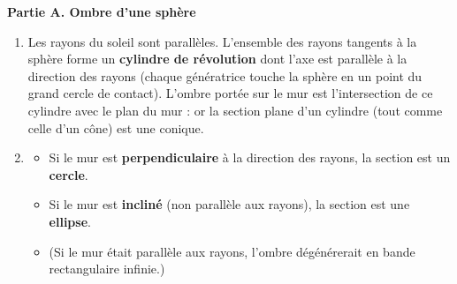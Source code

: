 \documentclass[11pt]{article}
\newcommand{\cle}[1]{{\popxbold\color{popdark}#1}}
\begin{document}
\begin{corrige}
\textbf{Partie A. Ombre d'une sphère}
\begin{enumerate}
\item Les rayons du soleil sont parallèles. L'ensemble des rayons tangents à la sphère forme un \textbf{cylindre de révolution} dont l'axe est parallèle à la direction des rayons (chaque génératrice touche la sphère en un point du grand cercle de contact). L'ombre portée sur le mur est l'intersection de ce cylindre avec le plan du mur : or la section plane d'un cylindre (tout comme celle d'un cône) est une \cle{conique}.
\item \begin{itemize}
    \item Si le mur est \textbf{perpendiculaire} à la direction des rayons, la section est un \textbf{cercle}.
    \item Si le mur est \textbf{incliné} (non parallèle aux rayons), la section est une \textbf{ellipse}.
    \item (Si le mur était parallèle aux rayons, l'ombre dégénérerait en bande rectangulaire infinie.)
  \end{itemize}
\end{enumerate}


\end{corrige}
\end{document}
